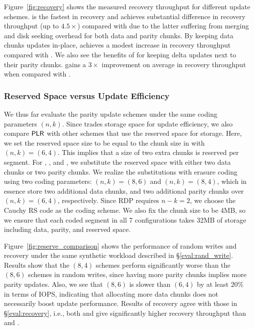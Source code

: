 Figure~\ref{fig:recovery} shows the measured recovery throughput for different update
schemes. \FO is the fastest in recovery and achieves substantial difference in
recovery throughput (up to ${4.5\times}$) compared with \FL due to the
latter suffering from merging and disk seeking overhead for both data and
parity chunks. By keeping data chunks updates in-place, \PL achieves a modest
increase in recovery throughput compared with \FL.  We also see the benefits
of \PLR for keeping delta updates next to their parity chunks.  \PLR
gains a ${3\times}$ improvement on average in recovery throughput when
compared with \PL.

\subsubsection{Reserved Space versus Update Efficiency}
\label{eval:reserve_comparison}

We thus far evaluate the parity update schemes under the same coding
parameters $(n,k)$.  Since \PLR trades storage space for update efficiency, we
also compare $\textsf{PLR}$ with other schemes that use the reserved space for
storage.  Here, we set the reserved space size to be equal to the chunk size
in \PLR with $(n,k) = (6,4)$.  This implies that a size of two extra chunks is
reserved per segment.   For \FO, \FL, and \PL, we substitute the reserved
space with either two data chunks or two parity chunks.  We realize the
substitutions with erasure coding using two coding parameters: $(n,k) = (8,6)$
and $(n,k) = (8,4)$, which in essence store two additional data chunks, and
two additional parity chunks over $(n,k) = (6,4)$, respectively.  Since RDP
requires $n-k=2$, we choose the Cauchy RS code \cite{blomer95} as the coding
scheme.  We also fix the chunk size to be 4MB, so we ensure that each coded
segment in all 7 configurations takes 32MB of storage including data, parity,
and reserved space.  

Figure~\ref{fig:reserve_comparison} shows the performance of random writes 
and recovery under the same synthetic workload described in
\S\ref{eval:rand_write}.  Results show that the $(8,4)$
schemes perform significantly worse than the $(8,6)$ schemes in random writes,
since having more parity chunks implies more parity updates.  Also, we
see that \FO $(8,6)$ is slower than \PLR $(6,4)$ by at least $20\%$ in terms
of IOPS, indicating that allocating more data chunks does not necessarily
boost update performance. Results of recovery agree with those in
\S\ref{eval:recovery}, i.e., both \FO and \PLR give significantly higher
recovery throughput than \FL and \PL. 

